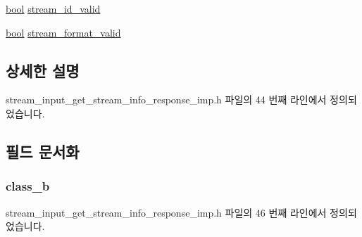 \begin{DoxyCompactItemize}
\item 
\hyperlink{avb__gptp_8h_af6a258d8f3ee5206d682d799316314b1}{bool} \hyperlink{structavdecc__lib_1_1stream__input__get__stream__info__response__imp_1_1stream__input__stream__info__flags_a55a28e49c305c48aa5f8034e4cd5cd4c}{stream\+\_\+id\+\_\+valid}
\item 
\hyperlink{avb__gptp_8h_af6a258d8f3ee5206d682d799316314b1}{bool} \hyperlink{structavdecc__lib_1_1stream__input__get__stream__info__response__imp_1_1stream__input__stream__info__flags_ad914b819b99c60f0c27472ee4292bd3e}{stream\+\_\+format\+\_\+valid}
\end{DoxyCompactItemize}


\subsection{상세한 설명}


stream\+\_\+input\+\_\+get\+\_\+stream\+\_\+info\+\_\+response\+\_\+imp.\+h 파일의 44 번째 라인에서 정의되었습니다.



\subsection{필드 문서화}
\subsubsection[{\texorpdfstring{class\+\_\+b}{class_b}}]{ class\+\_\+b}\hypertarget{structavdecc__lib_1_1stream__input__get__stream__info__response__imp_1_1stream__input__stream__info__flags_abc5d506df26fed870be7682ddbcaf9af}{}\label{structavdecc__lib_1_1stream__input__get__stream__info__response__imp_1_1stream__input__stream__info__flags_abc5d506df26fed870be7682ddbcaf9af}


stream\+\_\+input\+\_\+get\+\_\+stream\+\_\+info\+\_\+response\+\_\+imp.\+h 파일의 46 번째 라인에서 정의되었습니다.

